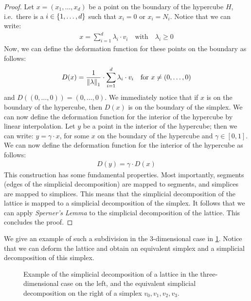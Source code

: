 \begin{proof}
	Let $x = (x_1, \dots, x_d)$ be a point on the boundary of the hypercube $H$, i.e.\ there is a $i \in \left\{1, \dots, d\right\}$ such that $x_i = 0$ or $x_i = N_i$. Notice that we can write:
	\begin{align*}
		x = \sum_{i=1}^{d} \lambda_i \cdot v_i \quad \text{with} \quad \lambda_i \geq 0
	\end{align*}
	Now, we can define the deformation function for these points on the boundary as follows:
	\begin{align*}
		D(x) = \frac{1}{\left\lVert\lambda\right\rVert_1} \cdot \sum_{i=1}^{d} \lambda_i \cdot v_i \quad \text{for $x \neq (0, \dots, 0)$}
	\end{align*}
	and $D((0, \dots, 0)) = (0, \dots, 0)$. We immediately notice that if $x$ is on the boundary of the hypercube, then $D(x)$ is on the boundary of the simplex. We can now define the deformation function for the interior of the hypercube by linear interpolation. Let $y$ be a point in the interior of the hypercube; then we can write: $y = \gamma \cdot x$, for some $x$ on the boundary of the hypercube and $\gamma \in [0, 1]$. We can now define the deformation function for the interior of the hypercube as follows:
	\begin{align*}
		D(y) = \gamma \cdot D(x)
	\end{align*}
	This construction has some fundamental properties. Most importantly, segments (edges of the simplicial decomposition) are mapped to segments, and simplices are mapped to simplices. This means that the simplicial decomposition of the lattice is mapped to a simplicial decomposition of the simplex. It follows that we can apply \textit{Sperner's Lemma} to the simplicial decomposition of the lattice. This concludes the proof.
\end{proof}

We give an example of such a subdivision in the 3-dimensional case in \cref{fig:sperner_lattice_example}. Notice that we can deform the lattice and obtain an equivalent simplex and a simplicial decomposition of this simplex.

\begin{figure}
	\centering
	\caption[Example of a simplicial decomposition of a lattice]{Example of the simplicial decomposition of a lattice in the three-dimensional case on the left, and the equivalent simplicial decomposition on the right of a simplex $v_0, v_1, v_2, v_3$.}\label{fig:sperner_lattice_example}
\end{figure}

